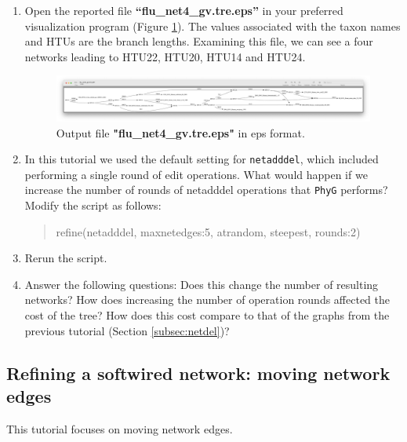 \documentclass[11pt]{article}
\newcommand{\phyg}{\texttt{PhyG} }
\begin{document}
\begin {enumerate}
\item  Open the reported file \textbf{``flu\_net4\_gv.tre.eps''} in your preferred
visualization program (Figure \ref{eps4}). The values associated with the taxon 
names and HTUs are the branch lengths. Examining this file, we can see a four
networks leading to HTU22, HTU20, HTU14 and HTU24.

\begin{figure}[H]
\centering
\includegraphics[width=\textwidth]{eps4.png}
\caption{Output file \textbf{"flu\_net4\_gv.tre.eps"} in eps format.}
\label{eps4}
\end{figure}

\item In this tutorial we used the default setting for \texttt{netadddel}, which 
included performing a single round of edit operations. What would happen 
if we increase the number of rounds of netadddel operations that \phyg 
performs? \\

Modify the script as follows:

	\begin{quote}
	refine(netadddel, maxnetedges:5, atrandom, steepest, rounds:2)
	\end{quote}
	
\item Rerun the script.

\item Answer the following questions: 
\subitem Does this change the number of resulting networks?
\subitem How does increasing the number of operation rounds affected the 
cost of the tree?
\subitem How does this cost compare to that of the graphs from the previous 
tutorial (Section \ref{subsec:netdel})?

\end{enumerate}
\subsection{Refining a softwired network: moving network edges}
\label{subsec:softnetmove}

This tutorial focuses on moving network edges.
\end{document}
